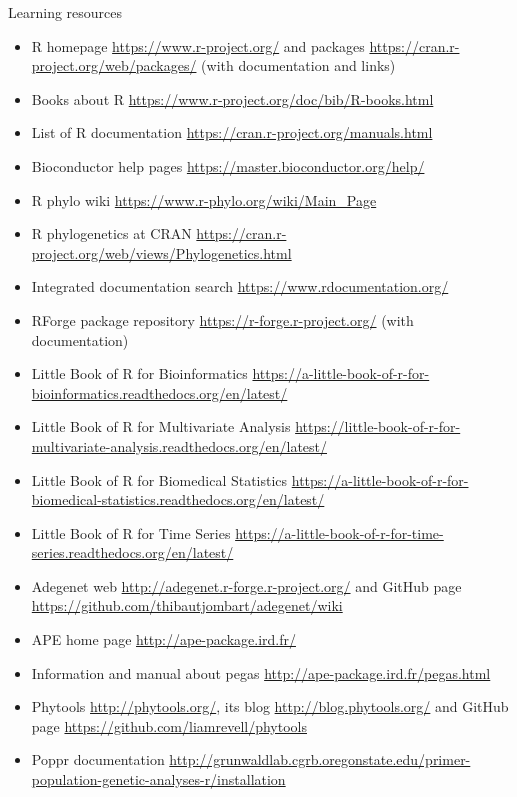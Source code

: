 \documentclass[compress, ucs, xelatex, 11pt, xcolor=svgnames,
  hyperref={
    bookmarks=true,
    unicode=true,
    colorlinks=true,
    pdftitle={Molecular data in R},
    plainpages=false,
    pdfauthor={Vojtech Zeisek},
    pdfsubject={Course about phylogeny and evolution in R},
    pdfcreator={XeLaTeX},
    pdfkeywords={R, evolution, phylogeny, molecular data},
    linkcolor=Tomato,
    anchorcolor=SaddleBrown,
    citecolor=Goldenrod,
    filecolor=DarkMagenta,
    menucolor=Sienna,
    urlcolor=DarkTurquoise,
    pdftex},
  url={hyphens, lowtilde} %
  ]{beamer}
\begin{document}
\begin{frame}[allowframebreaks]{Learning resources}
  \begin{itemize}
    \item R homepage \url{https://www.r-project.org/} and packages \url{https://cran.r-project.org/web/packages/} (with documentation and links)
    \item Books about R \url{https://www.r-project.org/doc/bib/R-books.html}
    \item List of R documentation \url{https://cran.r-project.org/manuals.html}
    \item Bioconductor help pages \url{https://master.bioconductor.org/help/}
    \item R phylo wiki \url{https://www.r-phylo.org/wiki/Main_Page}
    \item R phylogenetics at CRAN \url{https://cran.r-project.org/web/views/Phylogenetics.html}
    \item Integrated documentation search \url{https://www.rdocumentation.org/}
    \item RForge package repository \url{https://r-forge.r-project.org/} (with documentation)
    \item Little Book of R for Bioinformatics \url{https://a-little-book-of-r-for-bioinformatics.readthedocs.org/en/latest/}
    \item Little Book of R for Multivariate Analysis \url{https://little-book-of-r-for-multivariate-analysis.readthedocs.org/en/latest/}
    \item Little Book of R for Biomedical Statistics \url{https://a-little-book-of-r-for-biomedical-statistics.readthedocs.org/en/latest/}
    \item Little Book of R for Time Series \url{https://a-little-book-of-r-for-time-series.readthedocs.org/en/latest/}
    \item Adegenet web \url{http://adegenet.r-forge.r-project.org/} and GitHub page \url{https://github.com/thibautjombart/adegenet/wiki}
    \item APE home page \url{http://ape-package.ird.fr/}
    \item Information and manual about pegas \url{http://ape-package.ird.fr/pegas.html}
    \item Phytools \url{http://phytools.org/}, its blog \url{http://blog.phytools.org/} and GitHub page \url{https://github.com/liamrevell/phytools}
    \item Poppr documentation \url{http://grunwaldlab.cgrb.oregonstate.edu/primer-population-genetic-analyses-r/installation}

\end{itemize}
\end{frame}
\end{document}
